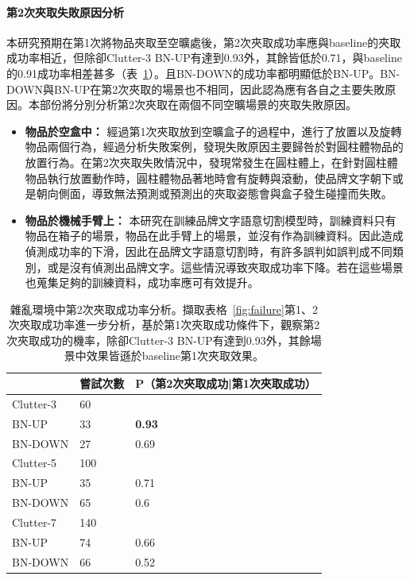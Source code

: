\paragraph{第2次夾取失敗原因分析}
本研究預期在第1次將物品夾取至空曠處後，第2次夾取成功率應與baseline的夾取成功率相近，但除卻Clutter-3 BN-UP有達到0.93外，其餘皆低於0.71，與baseline的0.91成功率相差甚多（表~\ref{table:second_picking}）。且BN-DOWN的成功率都明顯低於BN-UP。BN-DOWN與BN-UP在第2次夾取的場景也不相同，因此認為應有各自之主要失敗原因。本部份將分別分析第2次夾取在兩個不同空曠場景的夾取失敗原因。
\begin{itemize}
\item \textbf{物品於空盒中：} 經過第1次夾取放到空曠盒子的過程中，進行了放置以及旋轉物品兩個行為，經過分析失敗案例，發現失敗原因主要歸咎於對圓柱體物品的放置行為。在第2次夾取失敗情況中，發現常發生在圓柱體上，在針對圓柱體物品執行放置動作時，圓柱體物品著地時會有旋轉與滾動，使品牌文字朝下或是朝向側面，導致無法預測或預測出的夾取姿態會與盒子發生碰撞而失敗。
\item \textbf{物品於機械手臂上：} 本研究在訓練品牌文字語意切割模型時，訓練資料只有物品在箱子的場景，物品在此手臂上的場景，並沒有作為訓練資料。因此造成偵測成功率的下滑，因此在品牌文字語意切割時，有許多誤判如誤判成不同類別，或是沒有偵測出品牌文字。這些情況導致夾取成功率下降。若在這些場景也蒐集足夠的訓練資料，成功率應可有效提升。
\end{itemize}


\begin{table}[H]
\centering
\caption{雜亂環境中第2次夾取成功率分析。擷取表格~\ref{fig:failure}第1、2次夾取成功率進一步分析，基於第1次夾取成功條件下，觀察第2次夾取成功的機率，除卻Clutter-3 BN-UP有達到0.93外，其餘場景中效果皆遜於baseline第1次夾取效果。}
\begin{tabular}{ll|l}
          & 嘗試次數 & P（第2次夾取成功|第1次夾取成功） \\ \hline
Clutter-3 & 60   &                    \\
BN-UP     & 33   & \textbf{0.93}      \\
BN-DOWN   & 27   & 0.69               \\ \hline
Clutter-5 & 100  &                    \\
BN-UP     & 35   & 0.71               \\
BN-DOWN   & 65   & 0.6                \\ \hline
Clutter-7 & 140  &                    \\
BN-UP     & 74   & 0.66               \\
BN-DOWN   & 66   & 0.52               \\ \hline
\end{tabular}
\label{table:second_picking}
\end{table}
